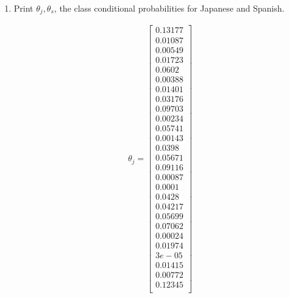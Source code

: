 \documentclass[a4paper]{article}
\theoremstyle{definition}
\newenvironment{soln}{
    \leavevmode\color{blue}\ignorespaces
}{}
\begin{document}
\begin{enumerate}
\item
Print $\theta_j, \theta_s$, the class conditional probabilities for Japanese and Spanish.

\begin{soln}
    \begin{minipage}{0.5\textwidth}
        \begin{gather*}
            \theta_{j} =\begin{bmatrix}
                            0.13177 \\
                            0.01087 \\
                            0.00549 \\
                            0.01723 \\
                            0.0602 \\
                            0.00388 \\
                            0.01401 \\
                            0.03176 \\
                            0.09703 \\
                            0.00234 \\
                            0.05741 \\
                            0.00143 \\
                            0.0398 \\
                            0.05671 \\
                            0.09116 \\
                            0.00087 \\
                            0.0001 \\
                            0.0428 \\
                            0.04217 \\
                            0.05699 \\
                            0.07062 \\
                            0.00024 \\
                            0.01974 \\
                            3e-05 \\
                            0.01415 \\
                            0.00772 \\
                            0.12345 \\
                        \end{bmatrix}

\end{gather*}
\end{minipage}
\end{soln}
\end{enumerate}
\end{document}
